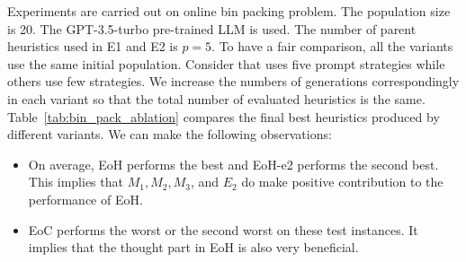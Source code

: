 Experiments are carried out on online bin packing problem. The population size is 20. The GPT-3.5-turbo pre-trained LLM is used. The number of parent heuristics used in E1 and E2 is $p=5$. To have a fair comparison, all the variants use the same initial population. Consider that \ourmethod{} uses five prompt strategies while others use few strategies. We increase the numbers of generations correspondingly in each variant so that the total number of evaluated heuristics is the same.  %
Table~\ref{tab:bin_pack_ablation} compares the final best heuristics produced by different variants. We can make the following observations: 
\begin{itemize}
    \item On average, EoH performs the best and EoH-e2 performs the second best. This implies that $M_1, M_2, M_3$, and $E_2$ do make positive contribution to the performance of EoH. 
    \item EoC performs the worst or the second worst on these test instances. It implies that the thought part in EoH is also very beneficial. 
\end{itemize}
 


\begin{table}[t]
\centering
\renewcommand{\arraystretch}{1.35}
\caption{Comparison of the gap to lower bound using heuristics designed by different versions on the six sets of Weibull instances. Each set consists of 5 instances sampled from the same distribution. In $a\_b$, $a$ means the number of items and $b$ means the capacity of bin.  
\label{tab:bin_pack_ablation}
}
\end{table}

\vspace{1pt}